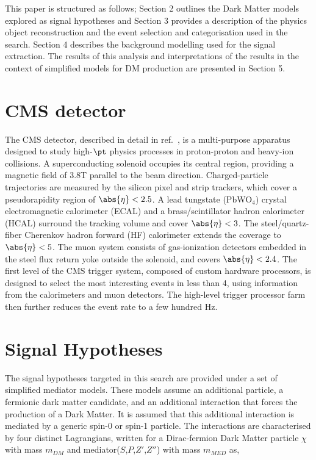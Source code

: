 This paper is structured as follows; Section 2 outlines the Dark Matter models
explored as signal hypotheses and Section 3 provides a description of the
physics object reconstruction and the event selection and categorisation used in
the search. Section 4 describes the background modelling used for the signal
extraction. The results of this analysis and interpretations of the results in
the context of simplified models for DM production are presented in Section 5.

\section{CMS detector}

The CMS detector, described in detail in ref.~\cite{CMSdetector}, is a
multi-purpose apparatus designed to study high-$\pt$ physics processes in
proton-proton and heavy-ion collisions.  A superconducting solenoid occupies its
central region, providing a magnetic field of 3.8\unit{T} parallel to the beam
direction. Charged-particle trajectories are measured by the silicon pixel and
strip trackers, which cover a pseudorapidity region of $\abs{\eta} < 2.5$. A
lead tungstate (PbWO$_4$) crystal electromagnetic calorimeter (ECAL) and a
brass/scintillator hadron calorimeter (HCAL) surround the tracking volume and
cover $\abs{\eta} < 3$. The steel/quartz-fiber Cherenkov hadron forward (HF)
calorimeter extends the coverage to $\abs{\eta} < 5$.  The muon system consists
of gas-ionization detectors embedded in the steel flux return yoke outside the
solenoid, and covers $\abs{\eta} < 2.4$. The first level of the CMS trigger
system, composed of custom hardware processors, is designed to select the most
interesting events in less than 4\mus, using information from the calorimeters
and muon detectors. The high-level trigger processor farm then further reduces
the event rate to a few hundred Hz.  \section{Signal Hypotheses} The signal
hypotheses targeted in this search are provided under a set of simplified
mediator models. These models assume an additional particle, a fermionic dark
matter candidate, and an additional interaction that forces the production of a
Dark Matter.  It is assumed that this additional interaction is mediated by a
generic spin-0 or spin-1 particle.  The interactions are characterised by four
distinct Lagrangians, written for a Dirac-fermion Dark Matter particle $\chi$
with mass $m_{DM}$ and mediator($S$,$P$,$Z'$,$Z''$) with mass $m_{MED}$ as, 

